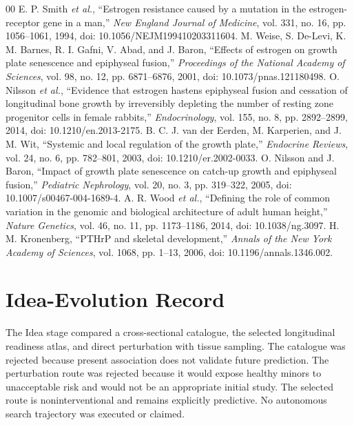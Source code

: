 \documentclass[conference]{IEEEtran}
\begin{document}
\begin{thebibliography}{00}
 E. P. Smith \textit{et al.}, ``Estrogen resistance caused by a mutation in the estrogen-receptor gene in a man,'' \textit{New England Journal of Medicine}, vol. 331, no. 16, pp. 1056--1061, 1994, doi: 10.1056/NEJM199410203311604.
 M. Weise, S. De-Levi, K. M. Barnes, R. I. Gafni, V. Abad, and J. Baron, ``Effects of estrogen on growth plate senescence and epiphyseal fusion,'' \textit{Proceedings of the National Academy of Sciences}, vol. 98, no. 12, pp. 6871--6876, 2001, doi: 10.1073/pnas.121180498.
 O. Nilsson \textit{et al.}, ``Evidence that estrogen hastens epiphyseal fusion and cessation of longitudinal bone growth by irreversibly depleting the number of resting zone progenitor cells in female rabbits,'' \textit{Endocrinology}, vol. 155, no. 8, pp. 2892--2899, 2014, doi: 10.1210/en.2013-2175.
 B. C. J. van der Eerden, M. Karperien, and J. M. Wit, ``Systemic and local regulation of the growth plate,'' \textit{Endocrine Reviews}, vol. 24, no. 6, pp. 782--801, 2003, doi: 10.1210/er.2002-0033.
 O. Nilsson and J. Baron, ``Impact of growth plate senescence on catch-up growth and epiphyseal fusion,'' \textit{Pediatric Nephrology}, vol. 20, no. 3, pp. 319--322, 2005, doi: 10.1007/s00467-004-1689-4.
 A. R. Wood \textit{et al.}, ``Defining the role of common variation in the genomic and biological architecture of adult human height,'' \textit{Nature Genetics}, vol. 46, no. 11, pp. 1173--1186, 2014, doi: 10.1038/ng.3097.
 H. M. Kronenberg, ``PTHrP and skeletal development,'' \textit{Annals of the New York Academy of Sciences}, vol. 1068, pp. 1--13, 2006, doi: 10.1196/annals.1346.002.
\end{thebibliography}

\appendices
\section{Idea-Evolution Record}

The Idea stage compared a cross-sectional catalogue, the selected longitudinal readiness atlas, and direct perturbation with tissue sampling. The catalogue was rejected because present association does not validate future prediction. The perturbation route was rejected because it would expose healthy minors to unacceptable risk and would not be an appropriate initial study. The selected route is noninterventional and remains explicitly predictive. No autonomous search trajectory was executed or claimed.
\end{document}
